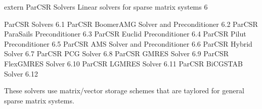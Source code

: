 \documentclass{article}
\begin{document}
\begin{cxxentry}
{extern }
        {ParCSR Solvers}
        {}
        {Linear solvers for sparse matrix systems}
        {6}
\begin{cxxnames}
\cxxitem{}
        {ParCSR Solvers}
        {}
        {
}
        {6.1}
\cxxitem{}
        {ParCSR BoomerAMG Solver and Preconditioner}
        {}
        {
}
        {6.2}
\cxxitem{}
        {ParCSR ParaSails Preconditioner}
        {}
        {
}
        {6.3}
\cxxitem{}
        {ParCSR Euclid Preconditioner }
        {}
        {
}
        {6.4}
\cxxitem{}
        {ParCSR Pilut Preconditioner}
        {}
        {
}
        {6.5}
\cxxitem{}
        {ParCSR AMS Solver and Preconditioner}
        {}
        {
}
        {6.6}
\cxxitem{}
        {ParCSR Hybrid Solver}
        {}
        {
}
        {6.7}
\cxxitem{}
        {ParCSR PCG Solver}
        {}
        {
}
        {6.8}
\cxxitem{}
        {ParCSR GMRES Solver}
        {}
        {
}
        {6.9}
\cxxitem{}
        {ParCSR FlexGMRES Solver}
        {}
        {
}
        {6.10}
\cxxitem{}
        {ParCSR LGMRES Solver}
        {}
        {
}
        {6.11}
\cxxitem{}
        {ParCSR BiCGSTAB Solver}
        {}
        {
}
        {6.12}
\end{cxxnames}
\begin{cxxdoc}


These solvers use matrix/vector storage schemes that are taylored
for general sparse matrix systems.



\end{cxxdoc}
\end{cxxentry}
\end{document}
